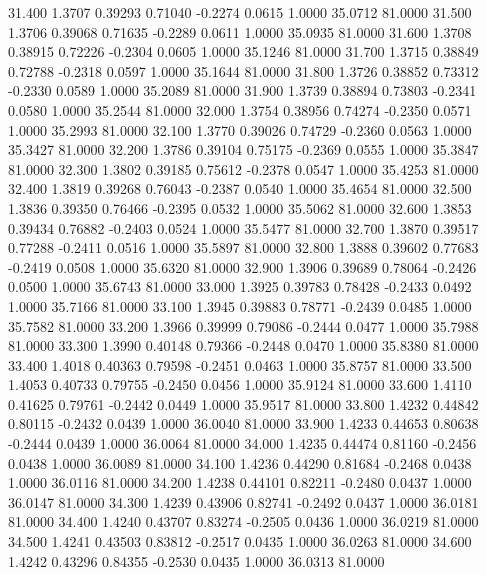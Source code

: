   31.400   1.3707   0.39293   0.71040  -0.2274   0.0615   1.0000  35.0712  81.0000
  31.500   1.3706   0.39068   0.71635  -0.2289   0.0611   1.0000  35.0935  81.0000
  31.600   1.3708   0.38915   0.72226  -0.2304   0.0605   1.0000  35.1246  81.0000
  31.700   1.3715   0.38849   0.72788  -0.2318   0.0597   1.0000  35.1644  81.0000
  31.800   1.3726   0.38852   0.73312  -0.2330   0.0589   1.0000  35.2089  81.0000
  31.900   1.3739   0.38894   0.73803  -0.2341   0.0580   1.0000  35.2544  81.0000
  32.000   1.3754   0.38956   0.74274  -0.2350   0.0571   1.0000  35.2993  81.0000
  32.100   1.3770   0.39026   0.74729  -0.2360   0.0563   1.0000  35.3427  81.0000
  32.200   1.3786   0.39104   0.75175  -0.2369   0.0555   1.0000  35.3847  81.0000
  32.300   1.3802   0.39185   0.75612  -0.2378   0.0547   1.0000  35.4253  81.0000
  32.400   1.3819   0.39268   0.76043  -0.2387   0.0540   1.0000  35.4654  81.0000
  32.500   1.3836   0.39350   0.76466  -0.2395   0.0532   1.0000  35.5062  81.0000
  32.600   1.3853   0.39434   0.76882  -0.2403   0.0524   1.0000  35.5477  81.0000
  32.700   1.3870   0.39517   0.77288  -0.2411   0.0516   1.0000  35.5897  81.0000
  32.800   1.3888   0.39602   0.77683  -0.2419   0.0508   1.0000  35.6320  81.0000
  32.900   1.3906   0.39689   0.78064  -0.2426   0.0500   1.0000  35.6743  81.0000
  33.000   1.3925   0.39783   0.78428  -0.2433   0.0492   1.0000  35.7166  81.0000
  33.100   1.3945   0.39883   0.78771  -0.2439   0.0485   1.0000  35.7582  81.0000
  33.200   1.3966   0.39999   0.79086  -0.2444   0.0477   1.0000  35.7988  81.0000
  33.300   1.3990   0.40148   0.79366  -0.2448   0.0470   1.0000  35.8380  81.0000
  33.400   1.4018   0.40363   0.79598  -0.2451   0.0463   1.0000  35.8757  81.0000
  33.500   1.4053   0.40733   0.79755  -0.2450   0.0456   1.0000  35.9124  81.0000
  33.600   1.4110   0.41625   0.79761  -0.2442   0.0449   1.0000  35.9517  81.0000
  33.800   1.4232   0.44842   0.80115  -0.2432   0.0439   1.0000  36.0040  81.0000
  33.900   1.4233   0.44653   0.80638  -0.2444   0.0439   1.0000  36.0064  81.0000
  34.000   1.4235   0.44474   0.81160  -0.2456   0.0438   1.0000  36.0089  81.0000
  34.100   1.4236   0.44290   0.81684  -0.2468   0.0438   1.0000  36.0116  81.0000
  34.200   1.4238   0.44101   0.82211  -0.2480   0.0437   1.0000  36.0147  81.0000
  34.300   1.4239   0.43906   0.82741  -0.2492   0.0437   1.0000  36.0181  81.0000
  34.400   1.4240   0.43707   0.83274  -0.2505   0.0436   1.0000  36.0219  81.0000
  34.500   1.4241   0.43503   0.83812  -0.2517   0.0435   1.0000  36.0263  81.0000
  34.600   1.4242   0.43296   0.84355  -0.2530   0.0435   1.0000  36.0313  81.0000
